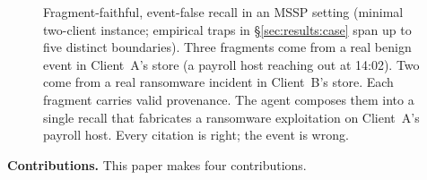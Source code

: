 \documentclass[conference,compsoc]{IEEEtran}
\begin{document}
\begin{figure}[t]
\caption{Fragment-faithful, event-false recall in an MSSP setting (minimal two-client instance; empirical traps in \S\ref{sec:results:case} span up to five distinct boundaries). Three fragments come from a real benign event in Client~A's store (a payroll host reaching out at 14:02). Two come from a real ransomware incident in Client~B's store. Each fragment carries valid provenance. The agent composes them into a single recall that fabricates a ransomware exploitation on Client~A's payroll host. Every citation is right; the event is wrong.}
\label{fig:overview}
\end{figure}

\textbf{Contributions.} This paper makes four contributions.
\end{document}
